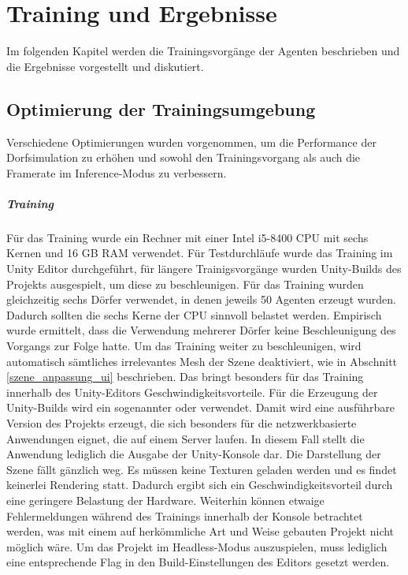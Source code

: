 \chapter{Training und Ergebnisse}\label{agenten_training}
Im folgenden Kapitel werden die Trainingsvorgänge der Agenten beschrieben und die Ergebnisse vorgestellt und diskutiert.


\section{Optimierung der Trainingsumgebung}
Verschiedene Optimierungen wurden vorgenommen, um die Performance der Dorfsimulation zu erhöhen und sowohl den Trainingsvorgang als auch die Framerate im Inference-Modus zu verbessern.

\paragraph{Training}
Für das Training wurde ein Rechner mit einer Intel i5-8400 CPU mit sechs Kernen und 16 GB RAM verwendet. Für Testdurchläufe wurde das Training im Unity Editor durchgeführt, für längere Trainigsvorgänge wurden Unity-Builds des Projekts ausgespielt, um diese zu beschleunigen. Für das Training wurden gleichzeitig sechs Dörfer verwendet, in denen jeweils 50 Agenten erzeugt wurden. Dadurch sollten die sechs Kerne der CPU sinnvoll belastet werden. Empirisch wurde ermittelt, dass die Verwendung mehrerer Dörfer keine Beschleunigung des Vorgangs zur Folge hatte.
Um das Training weiter zu beschleunigen, wird automatisch sämtliches irrelevantes Mesh der Szene deaktiviert, wie in Abschnitt \ref{szene_anpassung_ui} beschrieben. Das bringt besonders für das Training innerhalb des Unity-Editors Geschwindigkeitsvorteile. Für die Erzeugung der Unity-Builds wird ein sogenannter  oder  verwendet. Damit wird eine ausführbare Version des Projekts erzeugt, die sich besonders für die netzwerkbasierte Anwendungen eignet, die auf einem Server laufen. In diesem Fall stellt die Anwendung lediglich die Ausgabe der Unity-Konsole dar. Die Darstellung der Szene fällt gänzlich weg. Es müssen keine Texturen geladen werden und es findet keinerlei Rendering statt. Dadurch ergibt sich ein Geschwindigkeitsvorteil durch eine geringere Belastung der Hardware. Weiterhin können etwaige Fehlermeldungen während des Trainings innerhalb der Konsole betrachtet werden, was mit einem auf herkömmliche Art und Weise gebauten Projekt nicht möglich wäre.
Um das Projekt im Headless-Modus auszuspielen, muss lediglich eine entsprechende Flag in den Build-Einstellungen des Editors gesetzt werden.
